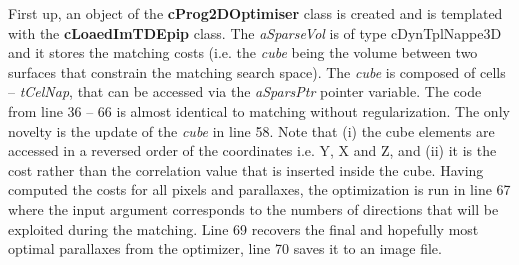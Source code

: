 First up, an object of the \textbf{cProg2DOptimiser} class is created and is templated with the \textbf{cLoaedImTDEpip} class. The \emph{aSparseVol} is of type cDynTplNappe3D and it stores the matching costs (i.e. the \emph{cube} being the volume between two surfaces that constrain the matching search space). The \emph{cube} is composed of cells -- \emph{tCelNap}, that can be accessed via the \emph{aSparsPtr} pointer variable. The code from line 36 -- 66 is almost identical to matching without regularization. The only novelty is the update of the \emph{cube} in line 58. Note that (i) the cube elements are accessed in a reversed order of the coordinates i.e. Y, X and Z, and (ii) it is the cost rather than the correlation value that is inserted inside the cube.\newline
Having computed the costs for all pixels and parallaxes, the optimization is run in line 67 where the input argument corresponds to the numbers of directions that will be exploited during the matching. Line 69 recovers the final and hopefully most optimal parallaxes from the optimizer, line 70 saves it to an image file.


